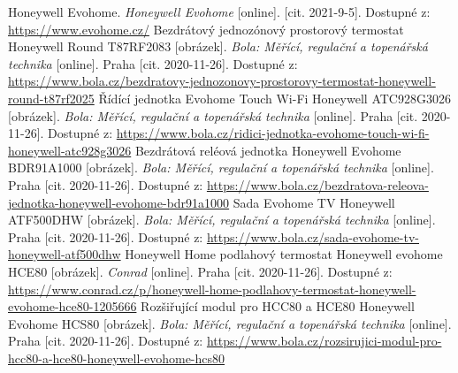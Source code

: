 \begin{thebibliography}{3}
Honeywell Evohome. \textit{Honeywell Evohome} [online]. [cit. 2021-9-5]. Dostupné z: \url{https://www.evohome.cz/}
Bezdrátový jednozónový prostorový termostat Honeywell Round T87RF2083 [obrázek]. \textit{Bola: Měřící, regulační a topenářská technika} [online]. Praha [cit. 2020-11-26]. Dostupné z: \url{https://www.bola.cz/bezdratovy-jednozonovy-prostorovy-termostat-honeywell-round-t87rf2025}
Řídící jednotka Evohome Touch Wi-Fi Honeywell ATC928G3026 [obrázek]. \textit{Bola: Měřící, regulační a topenářská technika} [online]. Praha [cit. 2020-11-26]. Dostupné z: \url{https://www.bola.cz/ridici-jednotka-evohome-touch-wi-fi-honeywell-atc928g3026}
Bezdrátová reléová jednotka Honeywell Evohome BDR91A1000 [obrázek]. \textit{Bola: Měřící, regulační a topenářská technika} [online]. Praha [cit. 2020-11-26]. Dostupné z: \url{https://www.bola.cz/bezdratova-releova-jednotka-honeywell-evohome-bdr91a1000}
Sada Evohome TV Honeywell ATF500DHW [obrázek]. \textit{Bola: Měřící, regulační a topenářská technika} [online]. Praha [cit. 2020-11-26]. Dostupné z: \url{https://www.bola.cz/sada-evohome-tv-honeywell-atf500dhw}
Honeywell Home podlahový termostat Honeywell evohome HCE80 [obrázek]. \textit{Conrad} [online]. Praha [cit. 2020-11-26]. Dostupné z: \url{https://www.conrad.cz/p/honeywell-home-podlahovy-termostat-honeywell-evohome-hce80-1205666}
Rozšiřující modul pro HCC80 a HCE80 Honeywell Evohome HCS80 [obrázek]. \textit{Bola: Měřící, regulační a topenářská technika} [online]. Praha [cit. 2020-11-26]. Dostupné z: \url{https://www.bola.cz/rozsirujici-modul-pro-hcc80-a-hce80-honeywell-evohome-hcs80}


\end{thebibliography}
